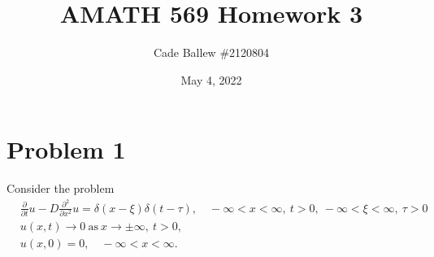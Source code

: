 \documentclass{article}
\title{AMATH 569 Homework 3}
\author{Cade Ballew \#2120804}
\date{May 4, 2022}
\begin{document}
	
\maketitle
	
\section{Problem 1}
Consider the problem
\begin{align*}
	&\frac{\partial}{\partial t}u-D\frac{\partial^2}{\partial x^2}u=\delta(x-\xi)\delta(t-\tau), \quad -\infty<x<\infty,~t>0,~-\infty<\xi<\infty,~\tau>0\\
	&u(x,t)\to0~\text{as}~x\to\pm\infty,~t>0,\\
	&u(x,0)=0, \quad -\infty<x<\infty.
\end{align*}
\end{document}
